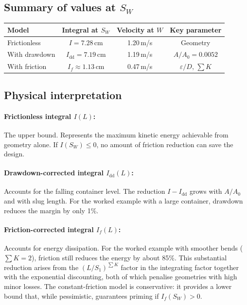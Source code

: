 \documentclass[11pt]{article}
\begin{document}
\subsection{Summary of values at $S_W$}

\begin{center}
\renewcommand{\arraystretch}{1.3}
\begin{tabular}{lccc}
\toprule
Model & Integral at $S_W$ & Velocity at $W$ & Key parameter \\
\midrule
Frictionless & $I = 7.28$\,cm & 1.20\,m/s & Geometry \\
With drawdown & $I_{\text{dd}} = 7.19$\,cm & 1.19\,m/s & $A/A_0 = 0.0052$ \\
With friction & $I_f \approx 1.13$\,cm & 0.47\,m/s & $\varepsilon/D$, $\sum K$ \\
\bottomrule
\end{tabular}
\end{center}

\subsection{Physical interpretation}

\paragraph{Frictionless integral $I(L)$:} The upper bound. Represents the maximum kinetic energy achievable from geometry alone. If $I(S_W) \leq 0$, no amount of friction reduction can save the design.

\paragraph{Drawdown-corrected integral $I_{\text{dd}}(L)$:} Accounts for the falling container level. The reduction $I - I_{\text{dd}}$ grows with $A/A_0$ and with slug length. For the worked example with a large container, drawdown reduces the margin by only 1\%.

\paragraph{Friction-corrected integral $I_f(L)$:} Accounts for energy dissipation. For the worked example with smoother bends ($\sum K = 2$), friction still reduces the energy by about 85\%. This substantial reduction arises from the $(L/S_1)^{\sum K}$ factor in the integrating factor together with the exponential discounting, both of which penalise geometries with high minor losses. The constant-friction model is conservative: it provides a lower bound that, while pessimistic, guarantees priming if $I_f(S_W) > 0$.
\end{document}
